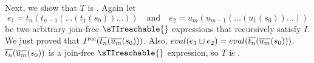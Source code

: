 \begin{elidableproof}
  Next, we show that $T$ is \dsTIreducible{}. Again let
  \[
    e_1 = t_n(t_{n-1}(\ldots (t_1(s_0))\ldots))
    \quad \text{and} \quad
    e_2 = u_m(u_{m-1}(\ldots (u_1(s_0))\ldots))
  \]
  be two arbitrary join-free $\sTIreachable{}$ expressions that recursively
  satisfy $I$. We just proved that $I^{\text{rec}}(\overline{t_{n}}(\overline{u_{m}}(s_0)))$. Also,
  $eval(e_1 \sqcup e_2) = eval(\overline{t_{n}}(\overline{u_{m}}(s_0)))$.
  $\overline{t_{n}}(\overline{u_{m}}(s_0))$ is a join-free $\sTIreachable{}$ expression, so $T$
  is \dsTIreducible{}.
\end{elidableproof}
